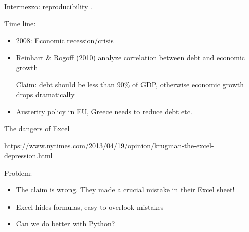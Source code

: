 \documentclass[aspectratio=169,usenames,dvipsnames]{beamer}
\begin{document}
\begin{frame}{Intermezzo: reproducibility}
    .

    Time line:
    \begin{itemize}
        \item 2008: Economic recession/crisis
        \item Reinhart \& Rogoff (2010) analyze correlation between debt and
            economic growth \\
            \begin{block}{Claim:}
            debt should be less than 90\% of GDP, otherwise economic growth
                drops dramatically
            \end{block}
        \item Austerity policy in EU, Greece needs to reduce debt etc.
    \end{itemize}
\end{frame}

\begin{frame}{The dangers of Excel}
    \begin{reference}
    \url{https://www.nytimes.com/2013/04/19/opinion/krugman-the-excel-depression.html}
    \end{reference}

    Problem:
    \begin{itemize}
        \item The claim is wrong.
            They made a crucial mistake in their Excel sheet!
        \item Excel hides formulas, easy to overlook mistakes
        \item Can we do better with Python?
    \end{itemize}

\end{frame}
\end{document}
